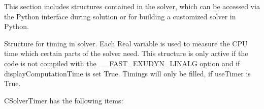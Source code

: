 This section includes structures contained in the solver, which can be accessed via the Python interface during solution or for building a customized solver in Python.


\label{sec:CSolverTimer}
Structure for timing in solver. Each Real variable is used to measure the CPU time which certain parts of the solver need. This structure is only active if the code is not compiled with the \_\_FAST\_EXUDYN\_LINALG option and if displayComputationTime is set True. Timings will only be filled, if useTimer is True.

\noindent CSolverTimer has the following items:
